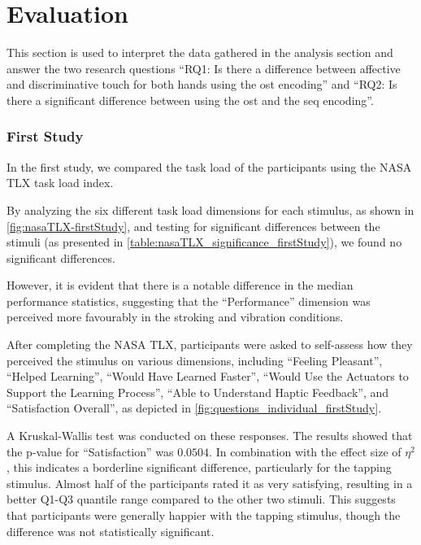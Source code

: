 \chapter{Evaluation}
\label{ch:Evaluation}

This section is used to interpret the data gathered in the analysis section and answer the two research questions \enquote{RQ1: Is there a difference between affective and discriminative touch for
both hands using the \gls{ost} encoding} and
\enquote{RQ2: Is there a significant
difference between using the \gls{ost} and the \gls{seq} encoding}.


\subsection{First Study}
In the first study, we compared the task load of the participants using the NASA TLX task load index. 

By analyzing the six different task load dimensions for each stimulus, as shown in \autoref{fig:nasaTLX-firstStudy}, and testing for significant differences between the stimuli (as presented in \autoref{table:nasaTLX_significance_firstStudy}), we found no significant differences. 

However, it is evident that there is a notable difference in the median performance statistics, suggesting that the \enquote{Performance} dimension was perceived more favourably in the stroking and vibration conditions.

After completing the NASA TLX, participants were asked to self-assess how they perceived the stimulus on various dimensions, including \enquote{Feeling Pleasant}, \enquote{Helped Learning}, \enquote{Would Have Learned Faster}, \enquote{Would Use the Actuators to Support the Learning Process}, \enquote{Able to Understand Haptic Feedback}, and \enquote{Satisfaction Overall}, as depicted in \autoref{fig:questions_individual_firstStudy}.

A Kruskal-Wallis test was conducted on these responses. The results showed that the p-value for \enquote{Satisfaction} was $0.0504$. In combination with the effect size of $\eta^2$, this indicates a borderline significant difference, particularly for the tapping stimulus. Almost half of the participants rated it as very satisfying, resulting in a better Q1-Q3 quantile range compared to the other two stimuli. This suggests that participants were generally happier with the tapping stimulus, though the difference was not statistically significant.


